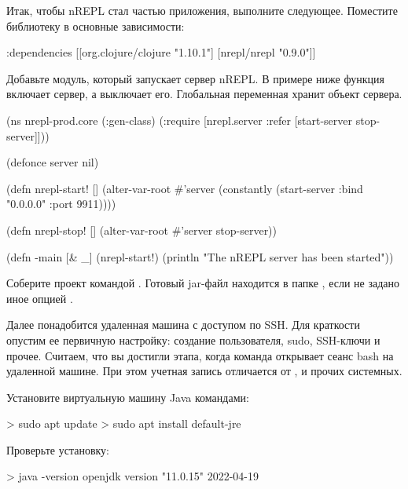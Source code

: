 Итак, чтобы nREPL стал частью приложения, выполните следующее. Поместите библиотеку  в основные зависимости:

\begin{english}
  \begin{clojure}
  :dependencies
  [[org.clojure/clojure "1.10.1"]
   [nrepl/nrepl "0.9.0"]]
  \end{clojure}
\end{english}

Добавьте модуль, который запускает сервер nREPL. В примере ниже функция  включает сервер, а  выключает его. Глобальная переменная  хранит объект сервера.

\begin{english}
  \begin{clojure}
(ns nrepl-prod.core
  (:gen-class)
  (:require
   [nrepl.server :refer [start-server stop-server]]))

(defonce server nil)

(defn nrepl-start! []
  (alter-var-root
   #'server
   (constantly
    (start-server :bind "0.0.0.0" :port 9911))))

(defn nrepl-stop! []
  (alter-var-root #'server stop-server))

(defn -main
  [& _]
  (nrepl-start!)
  (println "The nREPL server has been started"))
  \end{clojure}
\end{english}

Соберите проект командой . Готовый jar-файл находится в папке , если не задано иное опцией .

Далее понадобится удаленная машина с доступом по SSH. Для краткости опустим ее первичную настройку: создание пользователя, sudo, SSH-ключи и прочее. Считаем, что вы достигли этапа, когда команда  открывает сеанс bash на удаленной машине. При этом учетная запись отличается от ,  и прочих системных.

Установите виртуальную машину Java командами:

\begin{english}
  \begin{bash}
> sudo apt update
> sudo apt install default-jre
  \end{bash}
\end{english}

Проверьте установку:

\begin{english}
  \begin{bash}
> java -version
openjdk version "11.0.15" 2022-04-19
  \end{bash}
\end{english}


